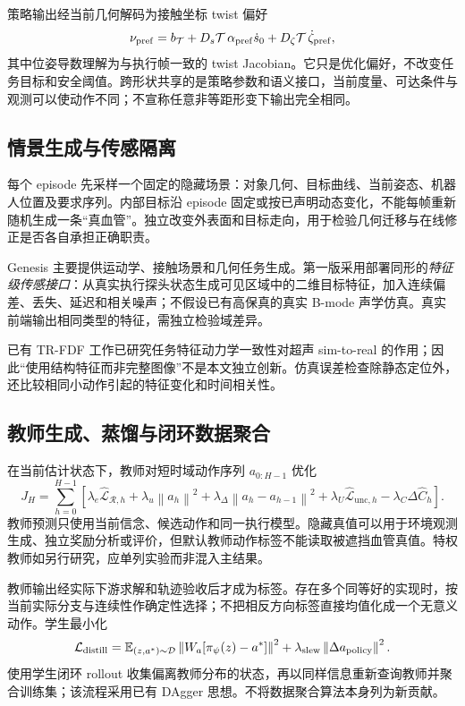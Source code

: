 \documentclass[UTF8,11pt,a4paper,fontset=fandol]{ctexart}
\numberwithin{equation}{section}
\theoremstyle{definition}
\newcommand{\E}{\mathbb E}
\newcommand{\norm}[1]{\left\lVert#1\right\rVert}
\begin{document}
策略输出经当前几何解码为接触坐标 twist 偏好
\begin{equation}
\nu_{\rm pref}
=b_{\mathcal T}
+D_s\mathcal T\,\alpha_{\rm pref}\dot s_0
+D_\zeta\mathcal T\,\dot\zeta_{\rm pref},
\label{eq:decodepolicy}
\end{equation}
其中位姿导数理解为与执行帧一致的 twist Jacobian。它只是优化偏好，不改变任务目标和安全阈值。跨形状共享的是策略参数和语义接口，当前度量、可达条件与观测可以使动作不同；不宣称任意非等距形变下输出完全相同。

\subsection{情景生成与传感隔离}
每个 episode 先采样一个固定的隐藏场景：对象几何、目标曲线、当前姿态、机器人位置及要求序列。内部目标沿 episode 固定或按已声明动态变化，不能每帧重新随机生成一条“真血管”。独立改变外表面和目标走向，用于检验几何迁移与在线修正是否各自承担正确职责。

Genesis 主要提供运动学、接触场景和几何任务生成。第一版采用部署同形的\emph{特征级传感接口}：从真实执行探头状态生成可见区域中的二维目标特征，加入连续偏差、丢失、延迟和相关噪声；不假设已有高保真的真实 B-mode 声学仿真。真实前端输出相同类型的特征，需独立检验域差异。

已有 TR-FDF 工作已研究任务特征动力学一致性对超声 sim-to-real 的作用\cite{trfdf}；因此“使用结构特征而非完整图像”不是本文独立创新。仿真误差检查除静态定位外，还比较相同小动作引起的特征变化和时间相关性。

\subsection{教师生成、蒸馏与闭环数据聚合}
在当前估计状态下，教师对短时域动作序列 $a_{0:H-1}$ 优化
\begin{equation}
J_H=\sum_{h=0}^{H-1}
\left[
\lambda_e\widehat{\mathcal L}_{\mathcal R,h}
+\lambda_u\norm{a_h}^2
+\lambda_\Delta\norm{a_h-a_{h-1}}^2
+\lambda_U\widehat{\mathcal L}_{\mathrm{unc},h}
-\lambda_C\Delta\widehat C_h
\right].
\label{eq:teacher}
\end{equation}
教师预测只使用当前信念、候选动作和同一执行模型。隐藏真值可以用于环境观测生成、独立奖励分析或评价，但默认教师动作标签不能读取被遮挡血管真值。特权教师如另行研究，应单列实验而非混入主结果。

教师输出经实际下游求解和轨迹验收后才成为标签。存在多个同等好的实现时，按当前实际分支与连续性作确定性选择；不把相反方向标签直接均值化成一个无意义动作。学生最小化
\begin{equation}
\mathcal L_{\rm distill}
=\E_{(z,a^*)\sim\mathcal D}
\norm{W_a[\pi_\psi(z)-a^*]}^2
+\lambda_{\rm slew}\norm{\Delta a_{\rm policy}}^2.
\label{eq:distill}
\end{equation}
使用学生闭环 rollout 收集偏离教师分布的状态，再以同样信息重新查询教师并聚合训练集；该流程采用已有 DAgger 思想\cite{dagger}。不将数据聚合算法本身列为新贡献。
\end{document}

